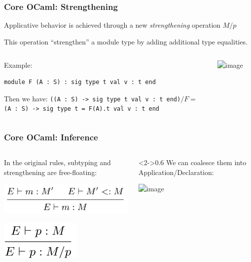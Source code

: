 \documentclass[aspectratio=169,dvipsnames,svgnames,10pt]{beamer}
\begin{document}
\begin{frame}[fragile]
  \frametitle{Core OCaml: Strengthening}

  Applicative behavior is achieved through a new \emph{strengthening} operation $M/p$
  
  This operation ``strengthen'' a module type by adding additional type equalities.
  \vfill
  
  \begin{columns}
    \begin{column}{0.5\textwidth}
      Example:
\begin{verbatim}
module F (A : S) : sig type t val v : t end
\end{verbatim}

      Then we have:
      \texttt{((A : S) -> sig type t val v : t end)}$/F =$\\
      \texttt{(A : S) -> sig type t = F(A).t val v : t end}
      
    \end{column}
    \begin{column}{0.5\textwidth}
      \includegraphics<2>[width=\linewidth]{strengthening.png}
    \end{column}
  \end{columns}

\end{frame}

\begin{frame}
  \frametitle{Core OCaml: Inference}
  \begin{columns}
    \begin{column}{0.4\textwidth}
      In the original rules, subtyping and strengthening are free-floating:
      \begin{center}
        \includegraphics[width=.8\linewidth]{subtyp.png}

        \includegraphics[width=.35\linewidth]{strength.png}
      \end{center}
    \end{column}
    \begin{column}<2->{0.6\textwidth}
      We can coalesce them into Application/Declaration:
      \begin{center}
        \includegraphics<2->[width=.9\linewidth]{inference.png}
      \end{center}
    \end{column}
  \end{columns}
  \vspace{3em}
\end{frame}
\end{document}
